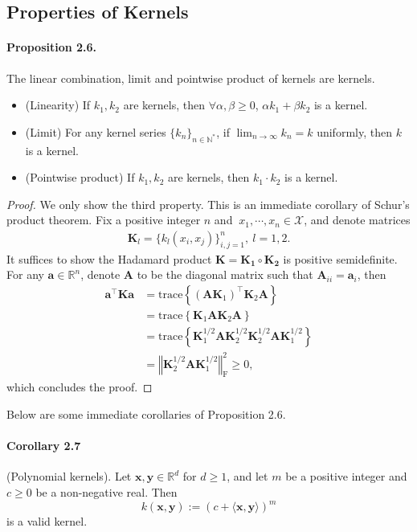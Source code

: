 \documentclass{article}
\begin{document}
\subsection{Properties of Kernels}
\paragraph{Proposition 2.6.} The linear combination, limit and pointwise product of kernels are kernels.
\begin{itemize}
	\item (Linearity) If $k_1,k_2$ are kernels, then $\forall \alpha,\beta \geq 0$, $\alpha k_1 + \beta k_2$ is a kernel.
	\item (Limit) For any kernel series $\lbrace k_n\rbrace_{n\in\mathbb{N}^{*}}$, if $\lim_{n\to\infty} k_n = k$ uniformly, then $k$ is a kernel.
	\item (Pointwise product) If $k_1,k_2$ are kernels, then $k_1\cdot k_2$ is a kernel.
\end{itemize}
\begin{proof}
We only show the third property. This is an immediate corollary of Schur's product theorem. Fix a positive integer $n$ and $\ x_1,\cdots,x_n\in\mathcal{X}$, and denote matrices
\begin{align*}
	\mathbf{K}_l = \lbrace k_l(x_i,x_j)\rbrace_{i,j=1}^n,\ l=1,2.\tag{2.8}
\end{align*}
It suffices to show the Hadamard product $\mathbf{K} = \mathbf{K_1}\circ\mathbf{K_2}$ is positive semidefinite. For any $\mathbf{a}\in\mathbb{R}^n$, denote $\mathbf{A}$ to be the diagonal matrix such that $\mathbf{A}_{ii}=\mathbf{a}_i$, then
\begin{align*}
	\mathbf{a}^\top\mathbf{Ka} &= \mathrm{trace}\left\lbrace(\mathbf{A}\mathbf{K}_1)^\top\mathbf{K}_2\mathbf{A}\right\rbrace \\
	&= \mathrm{trace}\left\lbrace\mathbf{K}_1\mathbf{A}\mathbf{K}_2\mathbf{A}\right\rbrace \\ 
	&= \mathrm{trace}\left\lbrace\mathbf{K}_1^{1/2}\mathbf{A}\mathbf{K}_2^{1/2}\mathbf{K}_2^{1/2}\mathbf{A}\mathbf{K}_1^{1/2}\right\rbrace \\
	&= \left\Vert\mathbf{K}_2^{1/2}\mathbf{A}\mathbf{K}_1^{1/2}\right\Vert_\mathrm{F}^2 \geq 0,\tag{2.9}
\end{align*}
which concludes the proof.
\end{proof}
Below are some immediate corollaries of Proposition 2.6.
\paragraph{Corollary 2.7} (Polynomial kernels). Let $\mathbf{x},\mathbf{y}\in\mathbb{R}^d$ for $d\geq 1$, and let $m$ be a positive integer and $c\geq 0$ be a non-negative real. Then
\begin{equation*}
	k(\mathbf{x},\mathbf{y}):= (c+\langle \mathbf{x},\mathbf{y}\rangle)^m\tag{2.10}
\end{equation*}
is a valid kernel.
\end{document}
